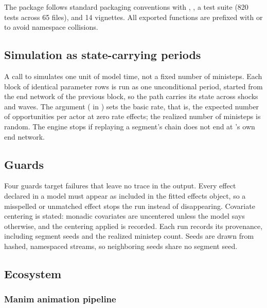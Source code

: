 \documentclass[
  article]{jss}
\begin{document}
The package follows standard  packaging conventions with
, , a  test suite (820
tests across 65 files), and 14 vignettes. All exported functions are
prefixed with  or  to avoid namespace
collisions.

\subsection{Simulation as state-carrying periods}\label{sec:periods}

A call to  simulates one unit of model time, not
a fixed number of ministeps. Each block of identical parameter rows is
run as one unconditional  period, started from the end
network of the previous block, so the path carries its state across
shocks and waves. The argument 
( in ) sets the basic rate,
that is, the expected number of opportunities per actor at zero rate
effects; the realized number of ministeps is random. The engine stops if
replaying a segment's chain does not end at 's own end
network.

\subsection{Guards}\label{sec:guards}

Four guards target failures that leave no trace in the output. Every
effect declared in a model must appear as included in the fitted
 effects object, so a misspelled or unmatched effect stops
the run instead of disappearing. Covariate centering is stated: monadic
covariates are uncentered unless the model says otherwise, and the
centering applied is recorded. Each run records its provenance,
including segment seeds and the realized ministep count. Seeds are drawn
from hashed, namespaced streams, so neighboring seeds share no segment
seed.

\subsection{Ecosystem}\label{sec:ecosystem}

\subsubsection{Manim animation pipeline}\label{sec:manim}
\end{document}
